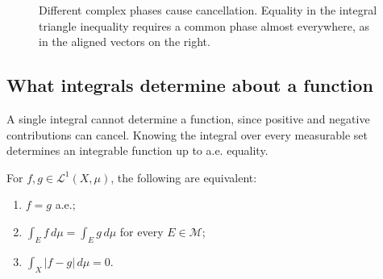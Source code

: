 \begin{figure}[htbp]
  \centering
  \caption{Different complex phases cause cancellation. Equality in
    the integral triangle inequality requires a common phase almost
    everywhere, as in the aligned vectors on the right.}
  \label{fig:complex-triangle-sep-24}
\end{figure}

\subsection{What integrals determine about a function}

A single integral cannot determine a function, since positive and
negative contributions can cancel. Knowing the integral over every
measurable set determines an integrable function up to a.e. equality.

\begin{proposition}\label{prop:ae-characterization-sep-24}
  For $f,g\in\mathcal L^1(X,\mu)$, the following are equivalent:
  \begin{enumerate}[label=(\roman*)]
    \item $f=g$ a.e.;
    \item $\displaystyle\int_E f\,d\mu=\int_E g\,d\mu$ for every
      $E\in\mathcal M$;
    \item $\displaystyle\int_X|f-g|\,d\mu=0$.
  \end{enumerate}
\end{proposition}

